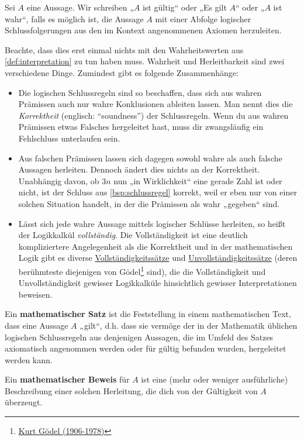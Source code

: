 \begin{de} \label{def:esgilt}
    Sei $A$ eine Aussage. Wir schreiben „$A$ ist gültig“ oder „Es gilt $A$“ oder „$A$ ist wahr“, falls es möglich ist, die Aussage $A$ mit einer Abfolge logischer Schlussfolgerungen aus den im Kontext angenommenen Axiomen herzuleiten.
\end{de}
 
 
\begin{bem}
    Beachte, dass dies erst einmal nichts mit den Wahrheitswerten aus \cref{def:interpretation} zu tun haben muss. Wahrheit und Herleitbarkeit sind zwei verschiedene Dinge. Zumindest gibt es folgende Zusammenhänge:
    \begin{itemize}
        \item Die logischen Schlussregeln sind so beschaffen, dass sich aus wahren Prämissen auch nur wahre Konklusionen ableiten lassen. Man nennt dies die \emph{Korrektheit} (englisch: ``soundness'') der Schlussregeln. Wenn du aus wahren Prämissen etwas Falsches hergeleitet hast, muss dir zwangsläufig ein Fehlschluss unterlaufen sein.
        \item Aus falschen Prämissen lassen sich dagegen sowohl wahre als auch falsche Aussagen herleiten. Dennoch ändert dies nichts an der Korrektheit. Unabhängig davon, ob $3n$ nun „in Wirklichkeit“ eine gerade Zahl ist oder nicht, ist der Schluss aus \cref{bsp:schlussregel} korrekt, weil er eben nur von einer solchen Situation handelt, in der die Prämissen als wahr „gegeben“ sind.
        \item Lässt sich jede wahre Aussage mittels logischer Schlüsse herleiten, so heißt der Logikkalkül \emph{vollständig}. Die Vollständigkeit ist eine deutlich kompliziertere Angelegenheit als die Korrektheit und in der mathematischen Logik gibt es diverse \href{https://ncatlab.org/nlab/show/completeness+theorem}{Vollständigkeitssätze} und \href{https://ncatlab.org/nlab/show/incompleteness+theorem}{Unvollständigkeitssätze} (deren berühmteste diejenigen von Gödel\footnote{\href{https://de.wikipedia.org/wiki/Kurt_G\%C3\%B6del}{Kurt Gödel (1906-1978)}} sind), die die Vollständigkeit und Unvollständigkeit gewisser Logikkalküle hinsichtlich gewisser Interpretationen beweisen.
    \end{itemize}
\end{bem}


\begin{de} 
    Ein \textbf{mathematischer Satz} ist die Feststellung in einem mathematischen Text, dass eine Aussage $A$ „gilt“, d.h. dass sie vermöge der in der Mathematik üblichen logischen Schlussregeln aus denjenigen Aussagen, die im Umfeld des Satzes axiomatisch angenommen werden oder für gültig befunden wurden, hergeleitet werden kann.
    
    Ein \textbf{mathematischer Beweis} für $A$ ist eine (mehr oder weniger ausführliche) Beschreibung einer solchen Herleitung, die dich von der Gültigkeit von $A$ überzeugt.
\end{de}


